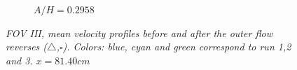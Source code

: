 \documentclass[a4paper, 11pt, english, twoside, openright]{article}
\begin{document}
\begin{figure}[]
{\begin{subfigure}[b]{.3\textwidth}
\caption{$A/H=0.2958$}
\end{subfigure}%
}
\caption{ \textit{FOV III, mean velocity profiles before and after the outer flow reverses ($\triangle$,$\square$). Colors: blue, cyan and green correspond to run 1,2 and 3. 
$x=81.40cm$} }
\label{fig:PIV_FOV5}
\end{figure}
\end{document}

